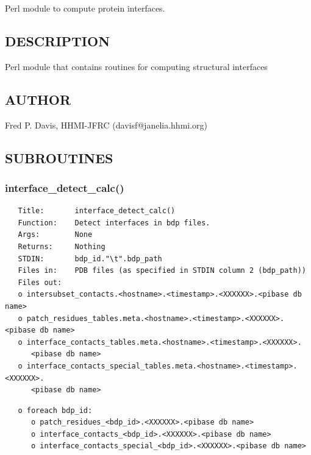 \documentclass{article}
\begin{document}
Perl module to compute protein interfaces.

\subsection*{DESCRIPTION\label{pibase::calc::interfaces_DESCRIPTION}}


Perl module that contains routines for computing structural interfaces

\subsection*{AUTHOR\label{pibase::calc::interfaces_AUTHOR}}


Fred P. Davis, HHMI-JFRC (davisf@janelia.hhmi.org)

\subsection*{SUBROUTINES\label{pibase::calc::interfaces_SUBROUTINES}}
\subsubsection*{interface\_detect\_calc()\label{pibase::calc::interfaces_interface_detect_calc_}}
\begin{verbatim}
   Title:       interface_detect_calc()
   Function:    Detect interfaces in bdp files.
   Args:        None
   Returns:     Nothing
   STDIN:       bdp_id."\t".bdp_path
   Files in:    PDB files (as specified in STDIN column 2 (bdp_path))
   Files out:
   o intersubset_contacts.<hostname>.<timestamp>.<XXXXXX>.<pibase db name>
   o patch_residues_tables.meta.<hostname>.<timestamp>.<XXXXXX>.<pibase db name>
   o interface_contacts_tables.meta.<hostname>.<timestamp>.<XXXXXX>.
      <pibase db name>
   o interface_contacts_special_tables.meta.<hostname>.<timestamp>.<XXXXXX>.
      <pibase db name>
\end{verbatim}
\begin{verbatim}
   o foreach bdp_id:
      o patch_residues_<bdp_id>.<XXXXXX>.<pibase db name>
      o interface_contacts_<bdp_id>.<XXXXXX>.<pibase db name>
      o interface_contacts_special_<bdp_id>.<XXXXXX>.<pibase db name>
\end{verbatim}
\end{document}
